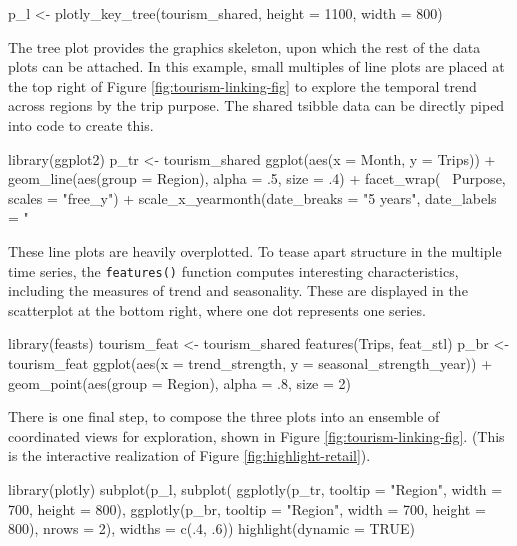 \begin{Schunk}
\begin{Sinput}
p_l <- plotly_key_tree(tourism_shared, height = 1100, width = 800)
\end{Sinput}
\end{Schunk}

The tree plot provides the graphics skeleton, upon which the rest of the
data plots can be attached. In this example, small multiples of line
plots are placed at the top right of Figure
\ref{fig:tourism-linking-fig} to explore the temporal trend across
regions by the trip purpose. The shared tsibble data can be directly
piped into  code to create this.

\begin{Schunk}
\begin{Sinput}
library(ggplot2)
p_tr <- tourism_shared %
  ggplot(aes(x = Month, y = Trips)) +
  geom_line(aes(group = Region), alpha = .5, size = .4) +
  facet_wrap(~ Purpose, scales = "free_y") +
  scale_x_yearmonth(date_breaks = "5 years", date_labels = "%
\end{Sinput}
\end{Schunk}

These line plots are heavily overplotted. To tease apart structure in
the multiple time series, the \texttt{features()} function computes
interesting characteristics, including the measures of trend and
seasonality. These are displayed in the scatterplot at the bottom right,
where one dot represents one series.

\begin{Schunk}
\begin{Sinput}
library(feasts)
tourism_feat <- tourism_shared %
  features(Trips, feat_stl)
p_br <- tourism_feat %
  ggplot(aes(x = trend_strength, y = seasonal_strength_year)) +
  geom_point(aes(group = Region), alpha = .8, size = 2)
\end{Sinput}
\end{Schunk}

There is one final step, to compose the three plots into an ensemble of
coordinated views for exploration, shown in Figure
\ref{fig:tourism-linking-fig}. (This is the interactive realization of
Figure \ref{fig:highlight-retail}).

\begin{Schunk}
\begin{Sinput}
library(plotly)
subplot(p_l,
  subplot(
    ggplotly(p_tr, tooltip = "Region", width = 700, height = 800),
    ggplotly(p_br, tooltip = "Region", width = 700, height = 800),
    nrows = 2),
  widths = c(.4, .6)) %
  highlight(dynamic = TRUE)
\end{Sinput}
\end{Schunk}

